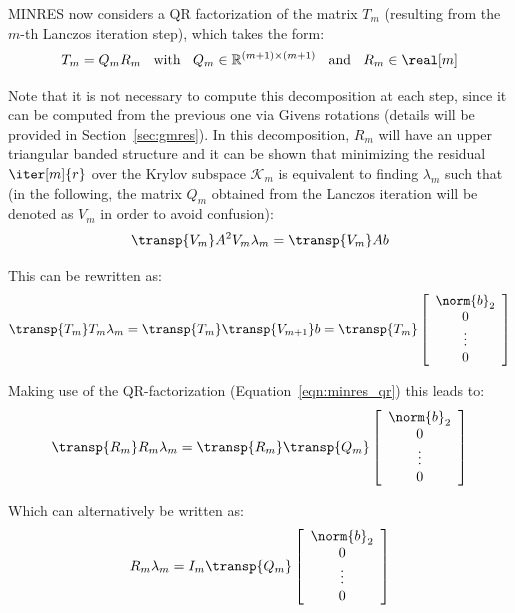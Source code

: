 MINRES now considers a QR factorization of the matrix $T_m$ (resulting from the $m$-th Lanczos iteration step), which takes the form:
\begin{equation}
\label{eqn:minres_qr}
    T_m= Q_m R_m \;\; \text{ with } \;\; Q_m \in \mathbb{R}^{(m+1)\times (m+1)}\;\; \text{ and } \;\; R_m \in \real[m]
\end{equation}

\noindent Note that it is not necessary to compute this decomposition at each step, since it can be computed from the previous one via Givens rotations (details will be provided in Section~\hyperref[sec:gmres]{\ref{sec:gmres}}). In this decomposition, $R_m$ will have an upper triangular banded structure and it can be shown that minimizing the residual $\iter[m]{r}$ over the Krylov subspace $\mathcal{K}_m$ is equivalent to finding $\lambda_m$ such that (in the following, the matrix $Q_m$ obtained from the Lanczos iteration will be denoted as $V_m$ in order to avoid confusion):
\begin{equation}
    \transp{V_m}A^2V_m\lambda_m = \transp{V_m}Ab
\end{equation}

\noindent This can be rewritten as:
\begin{equation}
    \transp{T_m}T_m\lambda_m=\transp{T_m}\transp{V_{m+1}}b = \transp{T_m}\left[
        \begin{array}{c}
      \norm{b}_2 \\
       0 \\
      \vdots \\
      0 \\
    \end{array}\right]
\end{equation}

\noindent Making use of the QR-factorization (Equation~\hyperref[eqn:minres_qr]{\ref{eqn:minres_qr}}) this leads to:
\begin{equation}
    \transp{R_m}R_m\lambda_m=\transp{R_m}\transp{Q_{m}}\left[
        \begin{array}{c}
      \norm{b}_2 \\
       0 \\
      \vdots \\
      0 \\
    \end{array}\right]
\end{equation}

\noindent Which can alternatively be written as:
\begin{equation}
    R_m\lambda_m=I_m\transp{Q_{m}}\left[
        \begin{array}{c}
      \norm{b}_2 \\
       0 \\
      \vdots \\
      0 \\
    \end{array}\right]
\end{equation}

